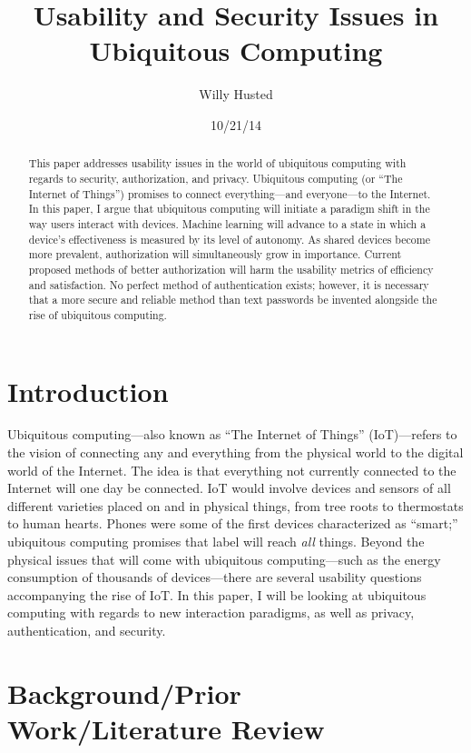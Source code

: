 \documentclass[11pt, oneside]{article}   	%
\title{Usability and Security Issues in Ubiquitous Computing}
\author{Willy Husted}
\date{10/21/14}							%
\begin{document}
\maketitle

\begin{abstract} %
This paper addresses usability issues in the world of ubiquitous computing with regards to security, authorization, and privacy. Ubiquitous computing (or ``The Internet of Things'') promises to connect everything---and everyone---to the Internet. In this paper, I argue that ubiquitous computing will initiate a paradigm shift in the way users interact with devices. Machine learning will advance to a state in which a device's effectiveness is measured by its level of autonomy. As shared devices become more prevalent, authorization will simultaneously grow in importance. Current proposed methods of better authorization will harm the usability metrics of efficiency and satisfaction. No perfect method of authentication exists; however, it is necessary that a more secure and reliable method than text passwords be invented alongside the rise of ubiquitous computing. 
\end{abstract}

\section{Introduction}
Ubiquitous computing---also known as ``The Internet of Things'' (IoT)---refers to the vision of connecting any and everything from the physical world to the digital world of the Internet. The idea is that everything not currently connected to the Internet will one day be connected. IoT would involve devices and sensors of all different varieties placed on and in physical things, from tree roots to thermostats to human hearts. Phones were some of the first devices characterized as ``smart;'' ubiquitous computing promises that label will reach \textit{all} things. Beyond the physical issues that will come with ubiquitous computing---such as the energy consumption of thousands of devices---there are several usability questions accompanying the rise of IoT. In this paper, I will be looking at ubiquitous computing with regards to new interaction paradigms, as well as privacy, authentication, and security.

\section{Background/Prior Work/Literature Review}
\end{document}
